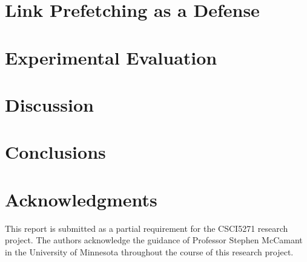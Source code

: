 \documentclass{sig-alternate-05-2015}
\begin{document}
\section{Link Prefetching as a Defense}
\label{sec4}


\section{Experimental Evaluation}
\label{sec5}


\section{Discussion}
\label{sec6}


\section{Conclusions}
\label{sec7}



\section{Acknowledgments}
This report is submitted as a partial requirement for the CSCI5271 research project.
The authors acknowledge the guidance of Professor Stephen McCamant in the University of Minnesota throughout the course of this research project.



\end{document}
